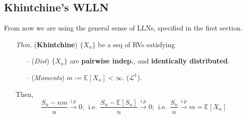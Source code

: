 \documentclass[a4paper,12pt,twoside]{book}
\begin{document}
\subsection{Khintchine's WLLN}
From now we are using the general sense of LLNs, specified in the first section.
\begin{itemize}
	\item[\textit{Thm.}] (\textbf{Khintchine}) $\{X_n\}$ be a seq of RVs satisfying
	\begin{itemize}
		\item[$\cdot$] (\textit{Dist}) $\{X_n\}$ are \textbf{pairwise indep.}, and \textbf{identically distributed}.
		\item[$\cdot$] (\textit{Moments}) $m:=\mathbb{E}\left[X_n\right]<\infty$. ($\mathcal{L}^1$).
	\end{itemize}
	Then,
	\begin{equation}
		\frac{S_n - nm}{n} \xrightarrow{i.p} 0;~~\text{i.e.}~~\frac{S_n - \mathbb{E}\left[S_n\right]}{n} \xrightarrow{i.p} 0;~~\text{i.e.}~~\frac{S_n}{n}\xrightarrow{i.p}m=\mathbb{E}\left[X_n\right]
	\end{equation}


\end{itemize}
\end{document}
